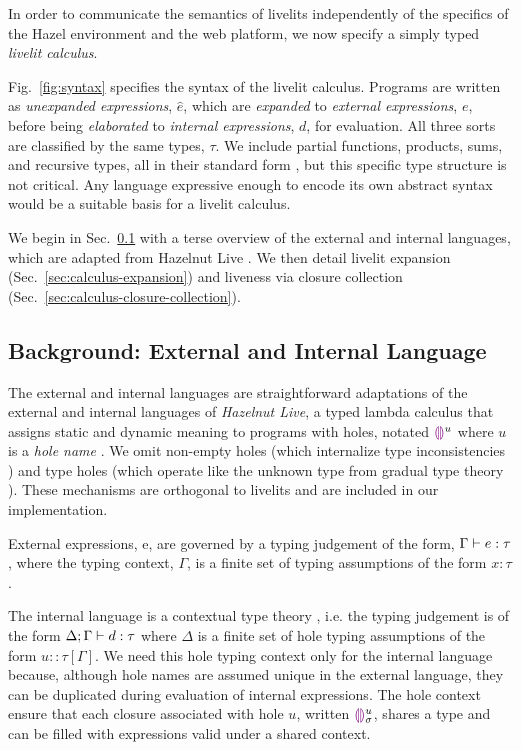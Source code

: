 In order to communicate the semantics of livelits
independently
of the specifics of the Hazel environment and the web platform, 
we now specify a simply typed \emph{livelit calculus}.

Fig.~\ref{fig:syntax} specifies the syntax of the livelit calculus.
Programs are written as \emph{unexpanded expressions}, $\hat e$, which are \emph{expanded} to
\emph{external expressions}, $e$, before being \emph{elaborated}
to \emph{internal expressions}, $d$, for evaluation. All three sorts are classified
by the same types, $\tau$. We include partial functions, products, sums, and recursive
types, all in their standard form \cite{pfpl}, but this specific type structure is not critical.
Any language expressive
enough to encode its own abstract syntax 
would be a suitable basis for a livelit calculus. 

We begin in Sec.~\ref{sec:external-and-internal-lang} with a terse
overview of the external and internal languages,
which are adapted from Hazelnut Live \cite{HazelnutLive}.
We then detail livelit expansion (Sec.~\ref{sec:calculus-expansion}) and 
liveness via closure collection (Sec.~\ref{sec:calculus-closure-collection}). 


\subsection{Background: External and Internal Language}\label{sec:external-and-internal-lang}
The external and internal languages are straightforward adaptations of the
external and internal languages of \emph{Hazelnut Live},
a typed lambda calculus that assigns static and dynamic meaning to programs with holes,
notated $\textcolor{violet}{\llparenthesis}\textcolor{violet}{\rrparenthesis}^{u}$ where $u$ is a \emph{hole name} \cite{HazelnutLive}.
We omit non-empty holes (which internalize type inconsistencies \cite{Hazelnut}) and type holes
(which operate like the unknown type from gradual type theory \cite{Siek06a,Hazelnut}).
These mechanisms are orthogonal to livelits and are included in our implementation.

External expressions, e, are governed by a typing judgement of the form, $\Gamma \vdash e : \tau$,
where the typing context, $\Gamma$,
is a finite set of typing assumptions of the form $x : \tau$ \cite{pfpl}.

The internal language is a contextual type theory \cite{Nanevski2008}, i.e. the typing judgement is
of the form $\Delta; \Gamma \vdash d : \tau$ where $\Delta$ is a finite set of hole typing
assumptions of the form $u :: \tau[\Gamma]$.
We need this hole typing context only for the internal language because, although hole names are assumed
unique in the external language, they can be duplicated during evaluation of internal expressions.
The hole context ensure that each closure associated with hole $u$, written ${\textcolor{violet}{\llparenthesis}\textcolor{violet}{\rrparenthesis}}{^{u}_{\sigma}}$,
shares a type and can be filled
with expressions valid under a shared context.

